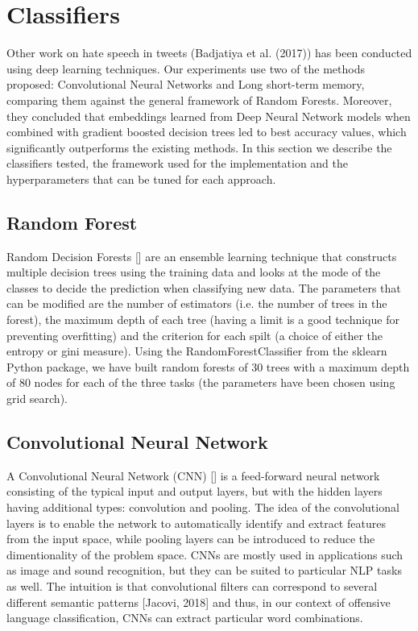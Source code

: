 \documentclass[11pt,a4paper]{article}
\begin{document}
\section{Classifiers}

Other work on hate speech in tweets (Badjatiya et al. (2017)) has been conducted using deep learning techniques. Our experiments use two of the methods proposed: Convolutional Neural Networks and Long short-term memory, comparing them against the general framework of Random Forests. Moreover, they concluded that embeddings learned from Deep Neural Network models when combined with gradient boosted decision trees led to best accuracy values, which significantly outperforms the existing methods. In this section we describe the classifiers tested, the framework used for the implementation and the hyperparameters that can be tuned for each approach.

\subsection{Random Forest}

Random Decision Forests [] are an ensemble learning technique that constructs multiple decision trees using the training data and looks at the mode of the classes to decide the prediction when classifying new data. The parameters that can be modified are the number of estimators (i.e. the number of trees in the forest), the maximum depth of each tree (having a limit is a good technique for preventing overfitting) and the criterion for each spilt (a choice of either the entropy or gini measure). Using the RandomForestClassifier from the sklearn Python package, we have built random forests of 30 trees with a maximum depth of 80 nodes for each of the three tasks (the parameters have been chosen using grid search).

\subsection{Convolutional Neural Network}

A Convolutional Neural Network (CNN) [] is a feed-forward neural network consisting of the typical input and output layers, but with the hidden layers having additional types: convolution and pooling. The idea of the convolutional layers is to enable the network to automatically identify and extract features from the input space, while pooling layers can be introduced to reduce the dimentionality of the problem space. CNNs are mostly used in applications such as image and sound recognition, but they can be suited to particular NLP tasks as well. The intuition is that convolutional filters can correspond to several different semantic patterns [Jacovi, 2018] and thus, in our context of offensive language classification, CNNs can extract particular word combinations.
\end{document}
